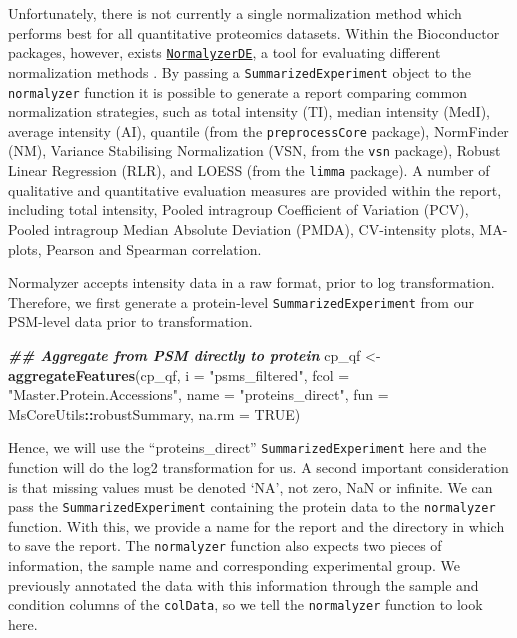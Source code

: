 \documentclass[9pt,a4paper,]{extarticle}
\newenvironment{Shaded}{\begin{snugshade}}{\end{snugshade}}
\newcommand{\AttributeTok}[1]{\textcolor[rgb]{0.13,0.29,0.53}{#1}}
\newcommand{\ConstantTok}[1]{\textcolor[rgb]{0.56,0.35,0.01}{#1}}
\newcommand{\DocumentationTok}[1]{\textcolor[rgb]{0.56,0.35,0.01}{\textbf{\textit{#1}}}}
\newcommand{\FunctionTok}[1]{\textcolor[rgb]{0.13,0.29,0.53}{\textbf{#1}}}
\newcommand{\NormalTok}[1]{#1}
\newcommand{\OtherTok}[1]{\textcolor[rgb]{0.56,0.35,0.01}{#1}}
\newcommand{\SpecialCharTok}[1]{\textcolor[rgb]{0.81,0.36,0.00}{\textbf{#1}}}
\newcommand{\StringTok}[1]{\textcolor[rgb]{0.31,0.60,0.02}{#1}}
\begin{document}
Unfortunately, there is not currently a single normalization method which
performs best for all quantitative proteomics datasets. Within the Bioconductor
packages, however, exists
\href{https://www.bioconductor.org/packages/release/bioc/html/NormalyzerDE.html}{\texttt{NormalyzerDE}},
a tool for evaluating different normalization methods \citep{Willforss2018}. By
passing a \texttt{SummarizedExperiment} object to the \texttt{normalyzer} function it is
possible to generate a report comparing common normalization strategies, such as
total intensity (TI), median intensity (MedI), average intensity (AI), quantile
(from the \texttt{preprocessCore} package)\citep{preprocessCore}, NormFinder (NM)\citep{Andersen2004},
Variance Stabilising Normalization (VSN, from the \texttt{vsn} package)\citep{Huber2002},
Robust Linear Regression (RLR), and LOESS (from the \texttt{limma} package)\citep{Smyth2004}.
A number of qualitative and quantitative evaluation measures are provided within
the report, including total intensity, Pooled intragroup Coefficient of Variation
(PCV), Pooled intragroup Median Absolute Deviation (PMDA), CV-intensity plots,
MA-plots, Pearson and Spearman correlation.

Normalyzer accepts intensity data in a raw format, prior to log transformation.
Therefore, we first generate a protein-level \texttt{SummarizedExperiment} from our
PSM-level data prior to transformation.

\begin{Shaded}
\begin{Highlighting}[]
\DocumentationTok{\#\# Aggregate from PSM directly to protein}
\NormalTok{cp\_qf }\OtherTok{\textless{}{-}} \FunctionTok{aggregateFeatures}\NormalTok{(cp\_qf,}
                           \AttributeTok{i =} \StringTok{"psms\_filtered"}\NormalTok{,}
                           \AttributeTok{fcol =} \StringTok{"Master.Protein.Accessions"}\NormalTok{,}
                           \AttributeTok{name =} \StringTok{"proteins\_direct"}\NormalTok{,}
                           \AttributeTok{fun =}\NormalTok{ MsCoreUtils}\SpecialCharTok{::}\NormalTok{robustSummary,}
                           \AttributeTok{na.rm =} \ConstantTok{TRUE}\NormalTok{)}
\end{Highlighting}
\end{Shaded}

Hence, we will use the ``proteins\_direct'' \texttt{SummarizedExperiment} here and the
function will do the log2 transformation for us. A second important consideration
is that missing values must be denoted `NA', not zero, NaN or infinite. We can
pass the \texttt{SummarizedExperiment} containing the protein data to the \texttt{normalyzer}
function. With this, we provide a name for the report and the directory in which
to save the report. The \texttt{normalyzer} function also expects two pieces of
information, the sample name and corresponding experimental group. We previously
annotated the data with this information through the sample and condition
columns of the \texttt{colData}, so we tell the \texttt{normalyzer} function to look here.
\end{document}
